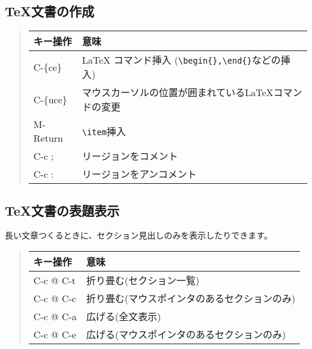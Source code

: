 \documentclass{jreport}
\begin{document}
\subsection{TeX文書の作成}

\begin{quote}
\begin{tabular}[t]{ll}\hline
キー操作 & 意味 \\ \hline
C-\{ce\} & LaTeX コマンド挿入 (\verb|\begin{},\end{}|などの挿入)\\
C-\{uce\} & マウスカーソルの位置が囲まれているLaTeXコマンドの変更 \\
M-Return & \verb|\item|挿入 \\
C-c ; & リージョンをコメント \\
C-c : & リージョンをアンコメント \\
\hline
\end{tabular}
\end{quote}

\subsection{TeX文書の表題表示}
長い文章つくるときに、セクション見出しのみを表示したりできます。

\begin{quote}
\begin{tabular}[t]{ll}\hline
キー操作 & 意味 \\ \hline
C-c @ C-t & 折り畳む(セクション一覧)\\
C-c @ C-c & 折り畳む(マウスポインタのあるセクションのみ)\\
C-c @ C-a  & 広げる(全文表示)\\
C-c @ C-e  & 広げる(マウスポインタのあるセクションのみ)\\
\hline
\end{tabular}
\end{quote}



\end{document}
